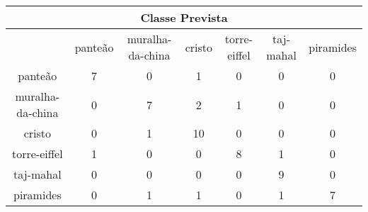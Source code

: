 \begin{tabular}{|c|c|c|c|c|c|c|}
\hline
\multicolumn{7}{|c|}{Classe Prevista}\\
\hline
 & panteão & muralha-da-china & cristo & torre-eiffel & taj-mahal & piramides\\
panteão & 7 & 0 & 1 & 0 & 0 & 0\\
muralha-da-china & 0 & 7 & 2 & 1 & 0 & 0\\
cristo & 0 & 1 & 10 & 0 & 0 & 0\\
torre-eiffel & 1 & 0 & 0 & 8 & 1 & 0\\
taj-mahal & 0 & 0 & 0 & 0 & 9 & 0\\
piramides & 0 & 1 & 1 & 0 & 1 & 7\\
\hline
\end{tabular}
